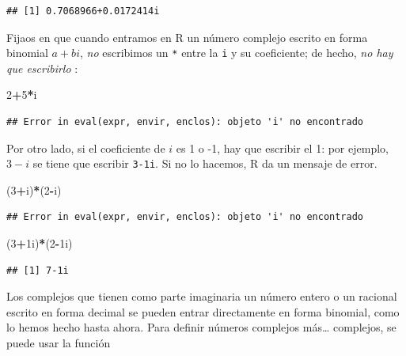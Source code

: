 \documentclass[]{book}
\newenvironment{Shaded}{\begin{snugshade}}{\end{snugshade}}
\newcommand{\DecValTok}[1]{\textcolor[rgb]{0.00,0.00,0.81}{#1}}
\newcommand{\NormalTok}[1]{#1}
\newcommand{\OperatorTok}[1]{\textcolor[rgb]{0.81,0.36,0.00}{\textbf{#1}}}
\theoremstyle{definition}
\theoremstyle{definition}
\theoremstyle{definition}
\theoremstyle{remark}
\begin{document}
\begin{verbatim}
## [1] 0.7068966+0.0172414i
\end{verbatim}

Fijaos en que cuando entramos en R un número complejo escrito en forma binomial \(a+bi\), \emph{no} escribimos un \texttt{*} entre la \texttt{i} y su coeficiente; de hecho, \emph{no hay que escribirlo} :

\begin{Shaded}
\begin{Highlighting}[]
\DecValTok{2}\OperatorTok{+}\DecValTok{5}\OperatorTok{*}\NormalTok{i}
\end{Highlighting}
\end{Shaded}

\begin{verbatim}
## Error in eval(expr, envir, enclos): objeto 'i' no encontrado
\end{verbatim}

Por otro lado, si el coeficiente de \(i\) es 1 o -1, hay que escribir el 1: por ejemplo, \(3-i\) se tiene que escribir \texttt{3-1i}. Si no lo hacemos, R da un mensaje de error.

\begin{Shaded}
\begin{Highlighting}[]
\NormalTok{(}\DecValTok{3}\OperatorTok{+}\NormalTok{i)}\OperatorTok{*}\NormalTok{(}\DecValTok{2}\OperatorTok{-}\NormalTok{i)}
\end{Highlighting}
\end{Shaded}

\begin{verbatim}
## Error in eval(expr, envir, enclos): objeto 'i' no encontrado
\end{verbatim}

\begin{Shaded}
\begin{Highlighting}[]
\NormalTok{(}\DecValTok{3}\OperatorTok{+}\NormalTok{1i)}\OperatorTok{*}\NormalTok{(}\DecValTok{2}\OperatorTok{-}\NormalTok{1i)}
\end{Highlighting}
\end{Shaded}

\begin{verbatim}
## [1] 7-1i
\end{verbatim}

Los complejos que tienen como parte imaginaria un número entero o un racional escrito en forma decimal se pueden entrar directamente en forma binomial, como lo hemos hecho hasta ahora. Para definir números complejos más\ldots{} complejos, se puede usar la función
\end{document}
